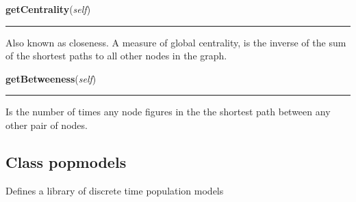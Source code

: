     \begin{boxedminipage}{\textwidth}

    \raggedright \textbf{getCentrality}(\textit{self})

    \vspace{-1.5ex}

    \rule{\textwidth}{0.5\fboxrule}
    Also known as closeness. A measure of global centrality, is the inverse
    of the sum of the shortest paths to all other nodes in the graph.

    \vspace{1ex}

    \end{boxedminipage}

    \label{Epigrass:simobj:siteobj:getBetweeness}

    \vspace{0.5ex}

    \begin{boxedminipage}{\textwidth}

    \raggedright \textbf{getBetweeness}(\textit{self})

    \vspace{-1.5ex}

    \rule{\textwidth}{0.5\fboxrule}
    Is the number of times any node figures in the the shortest path 
    between any other pair of nodes.

    \vspace{1ex}

    \end{boxedminipage}



\subsection{Class popmodels}

    \label{Epigrass:simobj:popmodels}
Defines a library of discrete time population models


